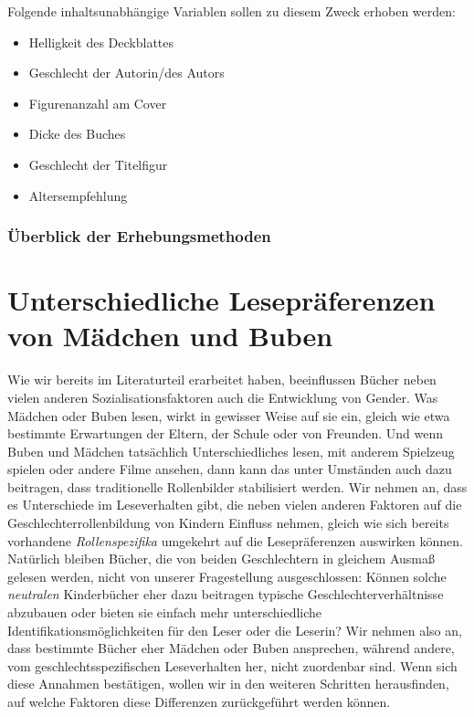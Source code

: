 Folgende inhaltsunabhängige Variablen sollen zu diesem Zweck erhoben
werden:

\begin{itemize}
\item
  Helligkeit des Deckblattes
\item
  Geschlecht der Autorin/des Autors
\item
  Figurenanzahl am Cover
\item
  Dicke des Buches
\item
  Geschlecht der Titelfigur
\item
  Altersempfehlung
\end{itemize}



\subsection{Überblick der Erhebungsmethoden}





\chapter{Unterschiedliche Lesepräferenzen von Mädchen und Buben}

Wie wir bereits im Literaturteil erarbeitet haben, beeinflussen Bücher
neben vielen anderen Sozialisationsfaktoren auch die Entwicklung von
Gender. Was Mädchen oder Buben lesen, wirkt in gewisser Weise auf sie
ein, gleich wie etwa bestimmte Erwartungen der Eltern, der Schule oder
von Freunden. Und wenn Buben und Mädchen tatsächlich Unterschiedliches
lesen, mit anderem Spielzeug spielen oder andere Filme ansehen, dann
kann das unter Umständen auch dazu beitragen, dass traditionelle
Rollenbilder stabilisiert werden. Wir nehmen an, dass es Unterschiede im
Leseverhalten gibt, die neben vielen anderen Faktoren auf die
Geschlechterrollenbildung von Kindern Einfluss nehmen, gleich wie sich
bereits vorhandene \emph{Rollenspezifika} umgekehrt auf die
Lesepräferenzen auswirken können. Natürlich bleiben Bücher, die von
beiden Geschlechtern in gleichem Ausmaß gelesen werden, nicht von
unserer Fragestellung ausgeschlossen: Können solche \emph{neutralen}
Kinderbücher eher dazu beitragen typische Geschlechterverhältnisse
abzubauen oder bieten sie einfach mehr unterschiedliche
Identifikationsmöglichkeiten für den Leser oder die Leserin? Wir nehmen
also an, dass bestimmte Bücher eher Mädchen oder Buben ansprechen,
während andere, vom geschlechtsspezifischen Leseverhalten her, nicht
zuordenbar sind. Wenn sich diese Annahmen bestätigen, wollen wir in den
weiteren Schritten herausfinden, auf welche Faktoren diese Differenzen
zurückgeführt werden können.

